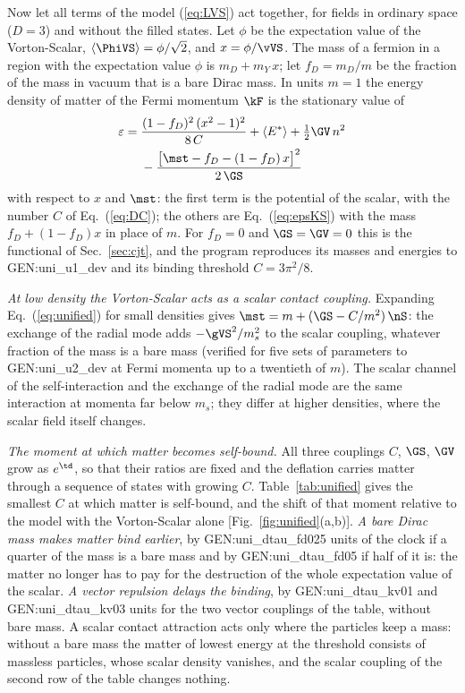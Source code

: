 Now let all terms of the model (\ref{eq:LVS}) act together, for fields in ordinary space ($D=3$) and
without the filled states. Let $\phi$ be the expectation value of the Vorton-Scalar,
$\langle\PhiVS\rangle=\phi/\sqrt2$, and $x=\phi/\vVS$. The mass of a fermion in a region with the
expectation value $\phi$ is $m_D+m_Y\,x$; let $f_D=m_D/m$ be the fraction of the mass in vacuum that
is a bare Dirac mass. In units $m=1$ the energy density of matter of the Fermi momentum $\kF$ is the
stationary value of
\begin{equation}
\begin{aligned}
\varepsilon={}&\frac{(1-f_D)^{2}\,(x^{2}-1)^{2}}{8\,C}+\langle E^{*}\rangle+\tfrac12\GV\,n^{2}\\
&-\frac{\big[\mst-f_D-(1-f_D)\,x\big]^{2}}{2\,\GS}
\end{aligned}
\label{eq:unified}
\end{equation}
with respect to $x$ and $\mst$: the first term is the potential of the scalar, with the number $C$
of Eq.~(\ref{eq:DC}); the others are Eq.~(\ref{eq:epsKS}) with the mass $f_D+(1-f_D)x$ in place of
$m$. For $f_D=0$ and $\GS=\GV=0$ this is the functional of Sec.~\ref{sec:cjt}, and the program
reproduces its masses and energies to {{GEN:uni_u1_dev}} and its binding threshold
$C=3\pi^{2}/8$.

\emph{At low density the Vorton-Scalar acts as a scalar contact coupling.} Expanding
Eq.~(\ref{eq:unified}) for small densities gives $\mst=m+(\GS-C/m^{2})\,\nS$: the exchange of the
radial mode adds $-\gVS^{2}/m_s^{2}$ to the scalar coupling, whatever fraction of the mass is a bare
mass (verified for five sets of parameters to {{GEN:uni_u2_dev}} at Fermi momenta up to a
twentieth of $m$). The scalar
channel of the self-interaction and the exchange of the radial mode are the same interaction at
momenta far below $m_s$; they differ at higher densities, where the scalar field itself changes.

\emph{The moment at which matter becomes self-bound.} All three couplings $C$, $\GS$, $\GV$ grow as
$e^{\td}$, so that their ratios are fixed and the deflation carries matter through a sequence of
states with growing $C$. Table~\ref{tab:unified} gives the smallest $C$ at which matter is
self-bound, and the shift of that moment relative to the model with the Vorton-Scalar alone
[Fig.~\ref{fig:unified}(a,b)]. \emph{A bare Dirac mass makes matter bind earlier}, by
{{GEN:uni_dtau_fd025}} units of the clock if a quarter of the mass is a bare mass and by
{{GEN:uni_dtau_fd05}} if half of it is: the matter no longer has to pay for the destruction of the
whole expectation value of the scalar. \emph{A vector repulsion delays the binding}, by
{{GEN:uni_dtau_kv01}} and {{GEN:uni_dtau_kv03}} units for the two vector couplings of the table,
without bare mass. A scalar contact attraction acts only where the particles keep a mass: without a
bare mass the matter of lowest energy at the threshold consists of massless particles, whose scalar
density vanishes, and the scalar coupling of the second row of the table changes nothing.

